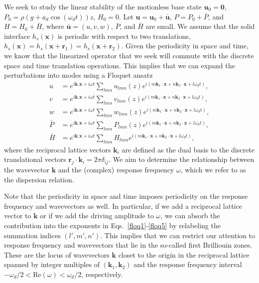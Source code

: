 \documentclass[aps,pre,amsmath,amssymb,floatfix,onecolumn,notitlepage,10pt]{revtex4-1}
\begin{document}
We seek to study the linear stability of the motionless base state $\mathbf{u}_0 = \mathbf{0}$, $P_0 = \rho(g+a_d\cos(\omega_d t))z$, $H_0=0$. Let $\mathbf{u} = \mathbf{u}_0 + \bar{\mathbf{u}}$, $P=P_0+\bar{P}$, and $H=H_0+\bar{H}$, where $\bar{\mathbf{u}} = (u,v,w)$, $\bar{P}$, and $\bar{H}$ are small.  We assume that the solid interface $h_s(\mathbf{x})$ is periodic with respect to two translations, $h_s(\mathbf{x}) = h_s(\mathbf{x}+\mathbf{r}_1) = h_s(\mathbf{x}+\mathbf{r}_2)$. Given the periodicity in space and time, we know that the linearized operator that we seek will commute with the discrete space and time translation operations. This implies \cite{2006_deconinck} that we can expand the perturbations into modes using a Floquet ansatz
\begin{align}
u &= e^{i\mathbf{k}.\mathbf{x} + i\omega t}\sum_{lmn} u_{lmn}(z) e^{i(m\mathbf{k}_1\cdot \mathbf{x} + n\mathbf{k}_2\cdot \mathbf{x} + l\omega_d t)}, \label{floq1} \\
v &= e^{i\mathbf{k}.\mathbf{x} + i\omega t}\sum_{lmn} v_{lmn}(z) e^{i(m\mathbf{k}_1\cdot \mathbf{x} + n\mathbf{k}_2\cdot \mathbf{x} + l\omega_d t)}, \label{floq2} \\
w &= e^{i\mathbf{k}.\mathbf{x} + i\omega t}\sum_{lmn} w_{lmn}(z) e^{i(m\mathbf{k}_1\cdot \mathbf{x} + n\mathbf{k}_2\cdot \mathbf{x} + l\omega_d t)}, \label{floq3} \\
\bar{P} &= e^{i\mathbf{k}.\mathbf{x} + i\omega t}\sum_{lmn} P_{lmn}(z) e^{i(m\mathbf{k}_1\cdot \mathbf{x} + n\mathbf{k}_2\cdot \mathbf{x} + l\omega_d t)}, \label{floq4} \\
\bar{H} &= e^{i\mathbf{k}.\mathbf{x} + i\omega t}\sum_{lmn} H_{lmn} e^{i(m\mathbf{k}_1\cdot \mathbf{x} + n\mathbf{k}_2\cdot \mathbf{x} + l\omega_d t)},  \label{floq5}
\end{align}
where the reciprocal lattice vectors $\mathbf{k}_i$ are defined as the dual basis to the discrete translational vectors $\mathbf{r}_j \cdot \mathbf{k}_i = 2\pi\delta_{ij}$. We aim to determine the relationship between the wavevector $\mathbf{k}$ and the (complex) response frequency $\omega$, which we refer to as the dispersion relation. 

Note that the periodicity in space and time imposes periodicity on the response frequency and wavevectors as well. In particular, if we add a reciprocal lattice vector to $\mathbf{k}$ or if we add the driving amplitude to $\omega$, we can absorb the contribution into the exponents in Eqs.~\eqref{floq1}-\eqref{floq5} by relabeling the summation indices $(l',m',n')$. This implies that we can restrict our attention to response frequency and wavevectors that lie in the so-called first Brilliouin zones. These are the locus of wavevectors $\mathbf{k}$ closet to the origin in the reciprocal lattice spanned by integer multiples of $(\mathbf{k}_1,\mathbf{k}_2)$ and the response frequency interval $-\omega_d/2 < \mathrm{Re}(\omega) < \omega_d/2$, respectively. 
\end{document}
